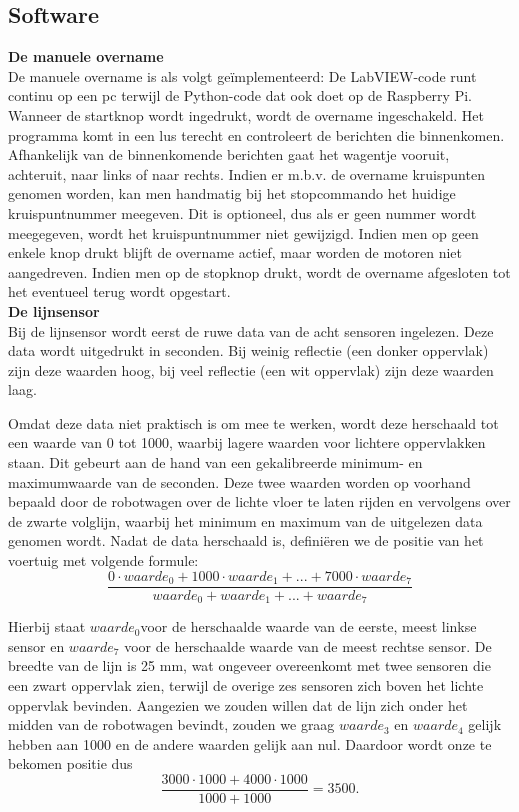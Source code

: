 \documentclass[a4paper,kulak]{kulakarticle}
\begin{document}
\subsection{Software}

\textbf{\large De manuele overname} \\
De manuele overname is als volgt geïmplementeerd: De LabVIEW-code runt continu op een pc terwijl de Python-code dat ook doet op de Raspberry Pi. Wanneer de startknop wordt ingedrukt, wordt de overname ingeschakeld. Het programma komt in een lus terecht en controleert de berichten die binnenkomen. Afhankelijk van de binnenkomende berichten gaat het wagentje vooruit, achteruit, naar links of naar rechts. Indien er m.b.v. de overname kruispunten genomen worden, kan men handmatig bij het stopcommando het huidige kruispuntnummer meegeven. Dit is optioneel, dus als er geen nummer wordt meegegeven, wordt het kruispuntnummer niet gewijzigd. Indien men op geen enkele knop drukt blijft de overname actief, maar worden de motoren niet aangedreven. Indien men op de stopknop drukt, wordt de overname afgesloten tot het eventueel terug wordt opgestart. \\

\textbf{\large De lijnsensor} \\
Bij de lijnsensor wordt eerst de ruwe data van de acht sensoren ingelezen. Deze data wordt uitgedrukt in seconden. Bij weinig reflectie (een donker oppervlak) zijn deze waarden hoog, bij veel reflectie (een wit oppervlak) zijn deze waarden laag. 

Omdat deze data niet praktisch is om mee te werken, wordt deze herschaald tot een waarde van 0 tot 1000, waarbij lagere waarden voor lichtere oppervlakken staan. Dit gebeurt aan de hand van een gekalibreerde minimum- en maximumwaarde van de seconden. Deze twee waarden worden op voorhand bepaald door de robotwagen over de lichte vloer te laten rijden en vervolgens over de zwarte volglijn, waarbij het minimum en maximum van de uitgelezen data genomen wordt. 
Nadat de data herschaald is, definiëren we de positie van het voertuig met volgende formule:
\begin{equation*}
	\frac{0\cdot waarde_{0} + 1000\cdot waarde_{1}+ ...+ 7000\cdot waarde_{7}} {waarde_{0} + waarde_{1} + ... + waarde_{7}}
\end{equation*}

Hierbij staat $waarde_{0} $voor de herschaalde waarde van de eerste, meest linkse sensor en $waarde_{7}$ voor de herschaalde waarde van de meest rechtse sensor. De breedte van de lijn is 25 mm, wat ongeveer overeenkomt met twee sensoren die een zwart oppervlak zien, terwijl de overige zes sensoren zich boven het lichte oppervlak bevinden. Aangezien we zouden willen dat de lijn zich onder het midden van de robotwagen bevindt, zouden we graag $waarde_{3}$ en $waarde_{4}$ gelijk hebben aan 1000 en de andere waarden gelijk aan nul. Daardoor wordt onze te bekomen positie dus\begin{equation*} \frac{3000\cdot1000+4000\cdot1000}{1000+1000} = 3500.\end{equation*}
\end{document}

